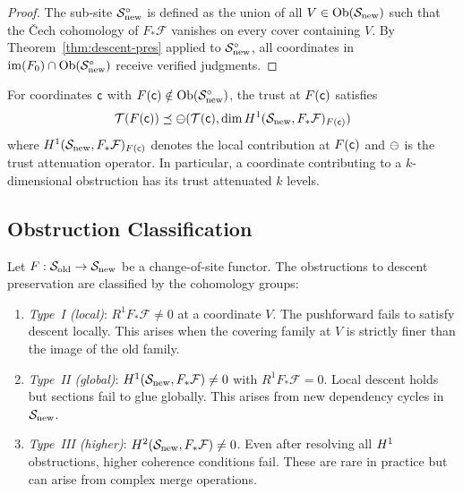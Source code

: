 \documentclass[11pt]{article}
\newcommand{\SiteOld}{\Site_{\mathrm{old}}}
\newcommand{\SiteNew}{\Site_{\mathrm{new}}}
\newcommand{\FunctorF}{F}
\newcommand{\Pushforward}{F_*}
\begin{document}
\begin{proof}
The sub-site $\SiteNew^{\circ}$ is defined as the union of all
$V \in \Ob(\SiteNew)$ such that the \v{C}ech cohomology of
$\Pushforward\mathcal{F}$ vanishes on every cover containing $V$.
By Theorem~\ref{thm:descent-pres} applied to $\SiteNew^{\circ}$, all
coordinates in $\mathrm{im}(\FunctorF_0) \cap \Ob(\SiteNew^{\circ})$
receive verified judgments.
\end{proof}

\begin{corollary}\label{cor:attenuation-bound}
For coordinates $\mathsf{c}$ with $\FunctorF(\coord) \notin \Ob(\SiteNew^{\circ})$,
the trust at $\FunctorF(\coord)$ satisfies
\[
  \trust(\FunctorF(\coord)) \tleq \tatten(\trust(\coord),
    \dim \Hcoh{1}(\SiteNew, \Pushforward\mathcal{F})_{\FunctorF(\coord)})
\]
where $\Hcoh{1}(\SiteNew, \Pushforward\mathcal{F})_{\FunctorF(\coord)}$
denotes the local contribution at $\FunctorF(\coord)$ and $\ominus$ is the
trust attenuation operator.  In particular, a coordinate contributing to a
$k$-dimensional obstruction has its trust attenuated $k$ levels.
\end{corollary}

\subsection{Obstruction Classification}\label{sec:obstruction-class}

\begin{theorem}\label{thm:obstruction-class}
Let $\FunctorF : \SiteOld \to \SiteNew$ be a change-of-site functor.
The obstructions to descent preservation are classified by the cohomology
groups:
\begin{enumerate}[noitemsep]
  \item \emph{Type~I (local)}: $R^1\Pushforward\mathcal{F} \neq 0$ at a
        coordinate $V$.  The pushforward fails to satisfy descent locally.
        This arises when the covering family at $V$ is strictly finer than
        the image of the old family.
  \item \emph{Type~II (global)}: $\Hcoh{1}(\SiteNew,
        \Pushforward\mathcal{F}) \neq 0$ with $R^1\Pushforward\mathcal{F}
        = 0$.  Local descent holds but sections fail to glue globally.
        This arises from new dependency cycles in $\SiteNew$.
  \item \emph{Type~III (higher)}: $\Hcoh{2}(\SiteNew,
        \Pushforward\mathcal{F}) \neq 0$.  Even after resolving all
        $H^{1}$ obstructions, higher coherence conditions fail.  These
        are rare in practice but can arise from complex merge operations.
\end{enumerate}
\end{theorem}
\end{document}
